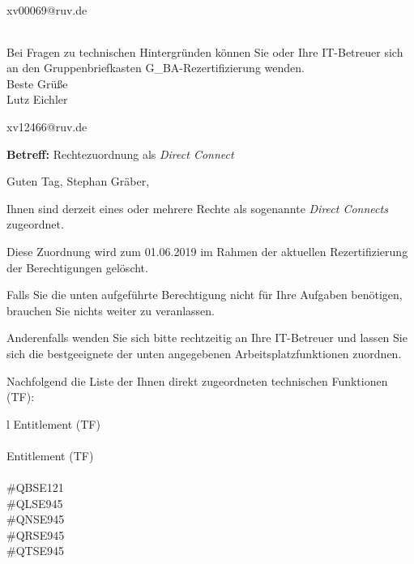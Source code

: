 \documentclass[a4paper,landscape,12pt]{letter}
\begin{document}
\begin{letter}{xv00069@ruv.de\hfill \break}
\begin{tiny}
\begin{longtable}{|p{35mm}|p{15mm}|p{25mm}|p{10mm}|p{40mm}|p{50mm}|p{50mm}|}
\hline
		\end{longtable}
		\end{tiny}
	
\begin{minipage}{\textwidth}
			Bei Fragen zu technischen Hintergründen können Sie 
			oder Ihre IT-Betreuer sich an den Gruppenbriefkasten 
			G\_BA-Rezertifizierung
			wenden.\\
			\linebreak
			Beste Grüße\\
			Lutz Eichler
	\end{minipage}
	\end{letter}
	
\begin{letter}{xv12466@ruv.de\hfill \break}
\begin{normalsize}
	\opening{\textbf{Betreff:} Rechtezuordnung als \emph{Direct Connect}}
	\begin{normalsize} \hfill
	\end{normalsize}

	\begin{normalsize}
		Guten Tag, 
	Stephan Gräber, \hfill \break
	\end{normalsize}
	\end{normalsize}
	
\begin{normalsize}
	Ihnen sind derzeit eines oder mehrere Rechte als sogenannte \emph{Direct Connects} zugeordnet.
	
	Diese Zuordnung wird zum 01.06.2019 im Rahmen der aktuellen Rezertifizierung der Berechtigungen gelöscht.
	
	Falls Sie die unten aufgeführte Berechtigung nicht für Ihre Aufgaben benötigen, 
	brauchen Sie nichts weiter zu veranlassen.
	
	Anderenfalls wenden Sie sich bitte rechtzeitig an Ihre IT-Betreuer 
	und lassen Sie sich die bestgeeignete der unten angegebenen Arbeitsplatzfunktionen zuordnen.
	\end{normalsize}
	
\begin{normalsize}
	Nachfolgend die Liste der Ihnen direkt zugeordneten technischen Funktionen (TF):

	\begin{longtable}{l}
		Entitlement (TF) \\ \hline
		\endfirsthead
		\\\hline
		Entitlement (TF) \\ \hline
		\endhead %
		\multicolumn{1}{r@{}}{Fortsetzung \ldots}\\
		\endfoot
		\hline
		\endlastfoot
	\#QBSE121\\\#QLSE945\\\#QNSE945\\\#QRSE945\\\#QTSE945\\
	\end{longtable}
	\end{normalsize}
	

\end{letter}
\end{document}
